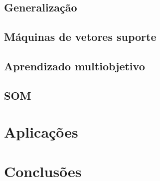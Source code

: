 \documentclass[conference]{IEEEtran}
\begin{document}
	
	
	
	
	
	
	\subsection{Generalização}
		
	\subsection{Máquinas de vetores suporte}
	\subsection{Aprendizado multiobjetivo}

	\subsection{SOM}
	
	\section{Aplicações}
	
	\section{Conclusões}

\end{document}
